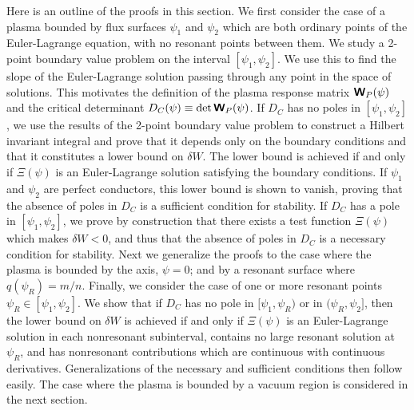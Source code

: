 \documentclass[prb,twocolumn,showpacs,preprintnumbers,amsmath,amssymb]{revtex4}
\renewcommand*{\t}[1]{\hbox{\sffamily\bfseries #1}}
\begin{document}
Here is an outline of the proofs in this section.  We first consider the
case of a plasma bounded by flux surfaces $\psi_1$ and $\psi_2$ which
are both ordinary points of the Euler-Lagrange equation, with no
resonant points between them.  We study a 2-point boundary value problem
on the interval $[\psi_1,\psi_2]$.  We use this to find the slope of the
Euler-Lagrange solution passing through any point in the space of
solutions.  This motivates the definition of the plasma response matrix
$\t{W}_P(\psi)$ and the critical determinant $D_C(\psi) \equiv \det
\t{W}_P(\psi)$.  If $D_C$ has no poles in $[\psi_1,\psi_2]$, we use the
results of the 2-point boundary value problem to construct a Hilbert
invariant integral and prove that it depends only on the boundary
conditions and that it constitutes a lower bound on $\delta W$.  The
lower bound is achieved if and only if $\Xi(\psi)$ is an Euler-Lagrange
solution satisfying the boundary conditions.  If $\psi_1$ and $\psi_2$
are perfect conductors, this lower bound is shown to vanish, proving
that the absence of poles in $D_C$ is a sufficient condition for
stability.  If $D_C$ has a pole in $[\psi_1,\psi_2]$, we prove by
construction that there exists a test function $\Xi(\psi)$ which makes
$\delta W < 0$, and thus that the absence of poles in $D_C$ is a
necessary condition for stability.  Next we generalize the proofs to the
case where the plasma is bounded by the axis, $\psi=0$; and by a
resonant surface where $q(\psi_R)=m/n$.  Finally, we consider the case
of one or more resonant points $\psi_R \in [\psi_1,\psi_2]$.  We show
that if $D_C$ has no pole in $[\psi_1,\psi_R)$ or in $(\psi_R,\psi_2]$,
then the lower bound on $\delta W$ is achieved if and only if
$\Xi(\psi)$ is an Euler-Lagrange solution in each nonresonant
subinterval, contains no large resonant solution at $\psi_R$, and has
nonresonant contributions which are continuous with continuous
derivatives.  Generalizations of the necessary and sufficient conditions
then follow easily.  The case where the plasma is bounded by a vacuum
region is considered in the next section.
\end{document}
